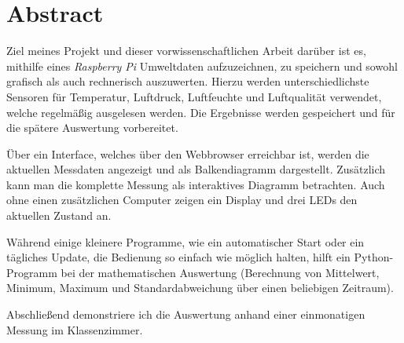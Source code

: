 \chapter*{Abstract}
\label{cha:abstract}

Ziel meines Projekt und dieser vorwissenschaftlichen Arbeit darüber ist es, mithilfe eines \emph{Raspberry Pi} Umweltdaten aufzuzeichnen, zu speichern und sowohl grafisch als auch rechnerisch auszuwerten.
Hierzu werden unterschiedlichste Sensoren für Temperatur, Luftdruck, Luftfeuchte und Luftqualität verwendet, welche regelmäßig ausgelesen werden. Die Ergebnisse werden gespeichert und für die spätere Auswertung vorbereitet.

Über ein Interface, welches über den Webbrowser erreichbar ist, werden die aktuellen Messdaten angezeigt und als Balkendiagramm dargestellt. Zusätzlich kann man die komplette Messung als interaktives Diagramm betrachten. Auch ohne einen zusätzlichen Computer zeigen ein Display und drei LEDs den aktuellen Zustand an.

Während einige kleinere Programme, wie ein automatischer Start oder ein tägliches Update, die Bedienung so einfach wie möglich halten, hilft ein Python-Programm bei der mathematischen Auswertung (Berechnung von Mittelwert, Minimum, Maximum und Standardabweichung über einen beliebigen Zeitraum).

Abschließend demonstriere ich die Auswertung anhand einer einmonatigen Messung im Klassenzimmer.